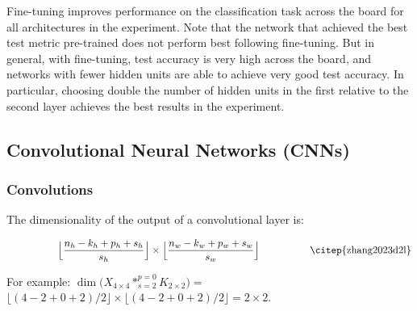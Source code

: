 Fine-tuning improves performance on the classification task across the board for all architectures in the experiment.
Note that the network that achieved the best test metric pre-trained does not perform best following fine-tuning.
But in general, with fine-tuning, test accuracy is very high across the board, and
networks with fewer hidden units are able to achieve very good test accuracy.
In particular, choosing double the number of hidden units in the first relative to the second layer achieves the best results in the experiment.

\newpage

\subsection{Convolutional Neural Networks (CNNs)}
\label{subsection:cnns}

\subsubsection{Convolutions}

The dimensionality of the output of a convolutional layer is:

\begin{equation}
    \qquad \qquad \quad
    \Big\lfloor \frac{n_h - k_h + p_h + s_h}{s_h} \Big\rfloor \times
    \Big\lfloor \frac{n_w - k_w + p_w + s_w}{s_w} \Big\rfloor
    \qquad \qquad \quad \text{\citep{zhang2023d2l}}
\end{equation}

For example:
$\dim\big( X_{4 \times 4} *^{p=0}_{s=2} K_{2 \times 2} \big) =$
$\lfloor (4 - 2 + 0 + 2) / 2 \rfloor \times \lfloor (4 - 2 + 0 + 2) / 2 \rfloor = 2 \times 2$.

